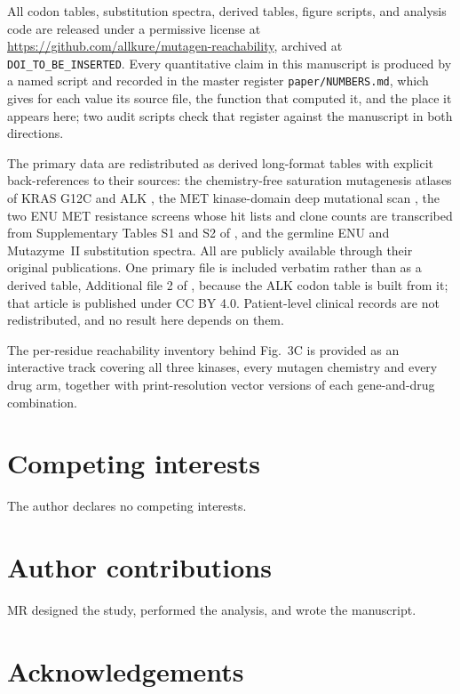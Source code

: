 \documentclass[11pt,a4paper]{article}
\begin{document}
All codon tables, substitution spectra, derived tables, figure scripts,
and analysis code are released under a permissive license at
\url{https://github.com/allkure/mutagen-reachability}, archived at
\texttt{DOI\_TO\_BE\_INSERTED}. Every quantitative claim in this
manuscript is produced by a named script and recorded in the master
register \texttt{paper/NUMBERS.md}, which gives for each value its
source file, the function that computed it, and the place it appears
here; two audit scripts check that register against the manuscript in
both directions.

The primary data are redistributed as derived long-format tables
with explicit back-references to their sources: the chemistry-free
saturation mutagenesis atlases of KRAS G12C \citep{feng2022} and ALK
\citep{oh2026}, the MET kinase-domain deep mutational scan
\citep{estevam2024}, the two ENU MET resistance screens whose hit
lists and clone counts are transcribed from Supplementary Tables S1
and S2 of \citep{tiedt2011}, and the germline ENU \citep{arnold2012}
and Mutazyme~II \citep{doi2022} substitution spectra. All are publicly
available through their original publications. One primary file is
included verbatim rather than as a derived table, Additional file 2 of
\citep{oh2026}, because the ALK codon table is built from it; that
article is published under CC BY 4.0. Patient-level clinical records
are not redistributed, and no result here depends on them.

The per-residue reachability inventory behind Fig.~3C is provided as
an interactive track covering all three kinases, every mutagen
chemistry and every drug arm, together with print-resolution vector
versions of each gene-and-drug combination.

\section*{Competing interests}

The author declares no competing interests.

\section*{Author contributions}

MR designed the study, performed the analysis, and wrote the
manuscript.

\section*{Acknowledgements}
\end{document}
